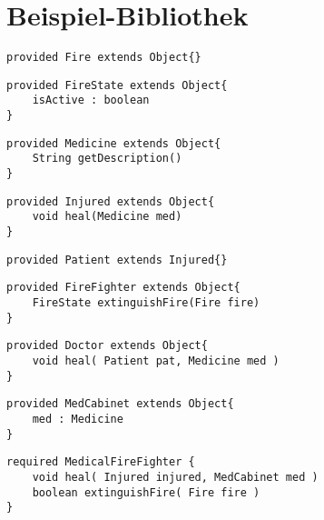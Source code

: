 \documentclass[a4paper,12pt]{article}
\begin{document}
\newpage
\section{Beispiel-Bibliothek}

\begin{lstlisting}[style = dsl]
provided Fire extends Object{}
\end{lstlisting}

\begin{lstlisting}[style = dsl]
provided FireState extends Object{
	isActive : boolean
}
\end{lstlisting}

 \begin{lstlisting}[style = dsl]
provided Medicine extends Object{
	String getDescription()
}
\end{lstlisting}

\begin{lstlisting}[style = dsl]
provided Injured extends Object{
	void heal(Medicine med)	
}
\end{lstlisting}


\begin{lstlisting}[style = dsl]
provided Patient extends Injured{}
\end{lstlisting}
\begin{lstlisting}[style = dsl]
provided FireFighter extends Object{
	FireState extinguishFire(Fire fire)
}
\end{lstlisting}

\begin{lstlisting}[style = dsl]
provided Doctor extends Object{	
	void heal( Patient pat, Medicine med )
}
\end{lstlisting}



\begin{lstlisting}[style = dsl]
provided MedCabinet extends Object{
	med : Medicine
}
\end{lstlisting}

\begin{lstlisting}[caption={Bibliothek von Typen},captionpos=b, style = dsl]
required MedicalFireFighter {
	void heal( Injured injured, MedCabinet med )
	boolean extinguishFire( Fire fire )	
}
\end{lstlisting}\label{lst:libEx}

\newpage
\end{document}
